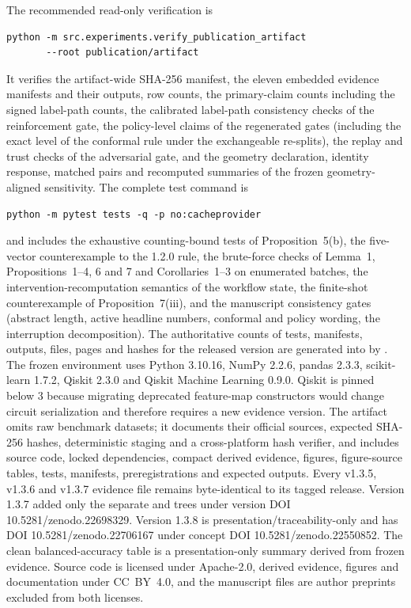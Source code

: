 \documentclass[10pt,journal,compsoc]{IEEEtran}
\begin{document}
The recommended read-only verification is
{\scriptsize
\begin{verbatim}
python -m src.experiments.verify_publication_artifact
       --root publication/artifact
\end{verbatim}
}
It verifies the artifact-wide SHA-256 manifest, the eleven embedded evidence
manifests and their outputs, row counts, the primary-claim counts including
the signed label-path counts, the calibrated label-path consistency checks of
the reinforcement gate, the policy-level claims of the regenerated gates
(including the exact level of the conformal rule under the exchangeable
re-splits), the replay and trust checks of the adversarial gate, and the
geometry declaration, identity response, matched pairs and recomputed
summaries of the frozen geometry-aligned sensitivity. The
complete test command is
{\scriptsize
\begin{verbatim}
python -m pytest tests -q -p no:cacheprovider
\end{verbatim}
}
and includes the exhaustive counting-bound tests of Proposition~5(b), the
five-vector counterexample to the 1.2.0 rule, the brute-force checks of
Lemma~1, Propositions~1--4, 6 and 7 and Corollaries~1--3 on enumerated
batches, the intervention-recomputation semantics of the workflow state, the
finite-shot counterexample of Proposition~7(iii), and the manuscript
consistency gates (abstract length, active headline numbers, conformal and
policy wording, the interruption decomposition). The authoritative counts of
tests, manifests, outputs, files, pages
and hashes for the released version are generated into
 by .
The frozen environment uses Python 3.10.16, NumPy 2.2.6, pandas 2.3.3,
scikit-learn 1.7.2, Qiskit 2.3.0 and Qiskit Machine Learning 0.9.0. Qiskit is
pinned below 3 because migrating deprecated feature-map constructors would
change circuit serialization and therefore requires a new evidence version.
The artifact omits raw benchmark datasets; it documents their official
sources, expected SHA-256 hashes, deterministic staging and a cross-platform
hash verifier, and includes source code, locked dependencies, compact derived
evidence, figures, figure-source tables, tests, manifests, preregistrations
and expected outputs. Every v1.3.5, v1.3.6 and v1.3.7 evidence file remains
byte-identical to its tagged release. Version 1.3.7 added only the separate
 and
 trees under version DOI
10.5281/zenodo.22698329. Version 1.3.8 is presentation/traceability-only and
has DOI 10.5281/zenodo.22706167 under concept DOI 10.5281/zenodo.22550852. The clean
balanced-accuracy table is a presentation-only
summary derived from frozen evidence. Source code is licensed under
Apache-2.0, derived evidence, figures and
documentation under CC~BY~4.0, and the manuscript files are author preprints
excluded from both licenses.
\end{document}
